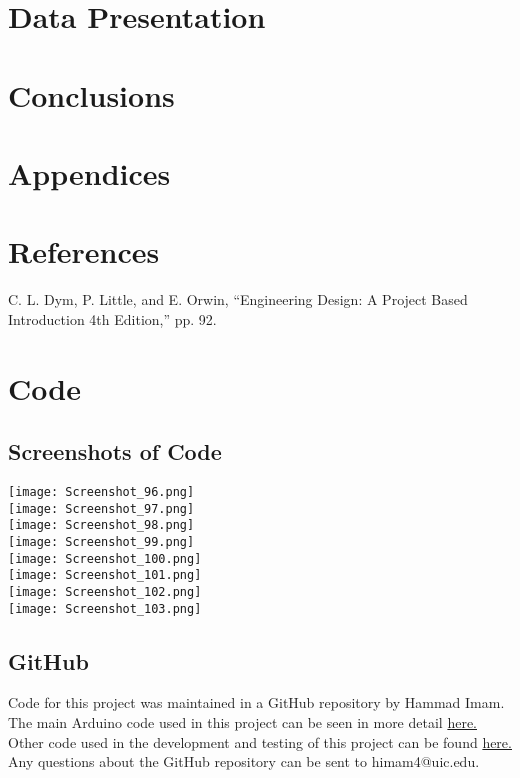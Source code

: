 \documentclass{article}
\begin{document}
\newpage
\section{Data Presentation}

\newpage
\section{Conclusions}

\newpage
\appendix
\section*{Appendices}
\section{References}

\begin{enumerate}[start=1,label={[\bfseries \arabic*]}]
    \item C. L. Dym, P. Little, and E. Orwin, “Engineering Design: A Project Based Introduction 4th Edition,” pp. 92.
\end{enumerate}

\section{Code}
\subsection{Screenshots of Code}

\texttt{[image: Screenshot\_96.png]}\\
\texttt{[image: Screenshot\_97.png]}\\
\texttt{[image: Screenshot\_98.png]}\\
\texttt{[image: Screenshot\_99.png]}\\
\texttt{[image: Screenshot\_100.png]}\\
\texttt{[image: Screenshot\_101.png]}\\
\texttt{[image: Screenshot\_102.png]}\\
\texttt{[image: Screenshot\_103.png]}\\

\subsection{GitHub}
    Code for this project was maintained in a GitHub repository by Hammad Imam. The main Arduino code used in this project can be seen in more detail \href{https://github.com/himam99/ME250-Proj3/blob/master/Code/me250_proj3_code/me250_proj3_code.ino}{here.} Other code used in the development and testing of this project can be found \href{https://github.com/himam99/ME250-Proj3/tree/master/Code}{here.} Any questions about the GitHub repository can be sent to himam4@uic.edu.
\end{document}
